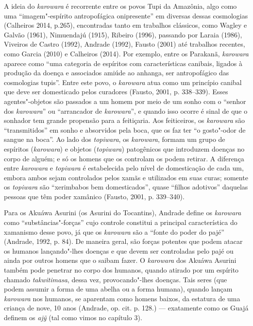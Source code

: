 A ideia do \emph{karowara} é recorrente entre os povos Tupi da Amazônia,
algo como uma ``imagem"-espírito antropofágica onipresente'' em diversas
dessas cosmologias (Calheiros 2014, p.265), encontradas tanto em
trabalhos clássicos, como Wagley e Galvão (1961), Nimuendajú (1915),
Ribeiro (1996), passando por Laraia (1986), Viveiros de Castro (1992),
Andrade (1992), Fausto (2001) até trabalhos recentes, como Garcia (2010)
e Calheiros (2014). Por exemplo, entre os Parakanã, \emph{karowara}
aparece como ``uma categoria de espíritos com características canibais,
ligados à produção da doença e associados amiúde ao anhanga, ser
antropofágico das cosmologias tupis''. Entre este povo, o \emph{karowara}
atua como um princípio canibal que deve ser domesticado pelos curadores
(Fausto, 2001, p. 338--339). Esses agentes"-objetos são passados a um
homem por meio de um sonho com o ``senhor dos \emph{karowara}'' ou
``arrancador de \emph{karowara}'', e quando isso ocorre é sinal de que o
sonhador tem grande propensão para a feitiçaria. Aos feiticeiros, os
\emph{karowara} são ``transmitidos'' em sonho e absorvidos pela boca, que
os faz ter ``o gosto"-odor de sangue na boca''. Ao lado dos
\emph{topiwara}, os \emph{karowara}, formam um grupo de espíritos
(\emph{karowara}) e objetos (\emph{topiwara}) patogênicos que introduzem
doenças no corpo de alguém; e só os homens que os controlam os podem
retirar. A diferença entre \emph{karowara} e \emph{topiwara} é
estabelecida pelo nível de domesticação de cada um, embora ambos sejam
controlados pelos xamãs e utilizados em suas curas; somente os
\emph{topiwara} são ``xerimbabos bem domesticados'', quase ``filhos
adotivos'' daquelas pessoas que têm poder xamânico (Fausto, 2001, p.
339--340).

Para os Akuáwa Asurini (os Asurini do Tocantins), Andrade define os
\emph{karowara} como ``substâncias"-forças'' cujo controle constitui a
principal característica do xamanismo desse povo, já que os
\emph{karowara} são a ``fonte do poder do pajé'' (Andrade, 1992, p. 84).
De maneira geral, são forças potentes que podem atacar os humanos
lançando"-lhes doenças e que devem ser controladas pelo pajé ou ainda por
outros homens que o saibam fazer. O \emph{karowara} dos Akuáwa Asurini
também pode penetrar no corpo dos humanos, quando atirado por um
espírito chamado \emph{takwitimasa}, dessa vez, provocando"-lhes doenças.
Tais seres (que podem assumir a forma de uma abelha ou a forma humana),
quando lançam \emph{karowara} nos humanos, se aparentam como homens
baixos, da estatura de uma criança de nove, 10 anos (Andrade, op. cit.
p. 128.) --- exatamente como os Guajá definem os \emph{ajỹ} (tal como
vimos no capítulo 3).

